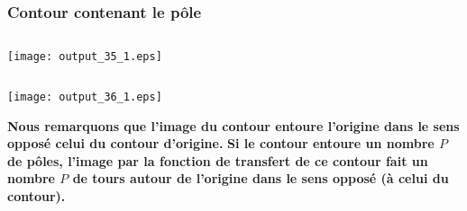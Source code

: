 \subsubsection{Contour contenant le pôle}
\begin{tcolorbox}[breakable, size=fbox, boxrule=1pt, pad at break*=1mm,colback=cellbackground, colframe=cellborder]
\inputminted{python}{codes/python/annexe_cauchy_cellule15.py}
\end{tcolorbox}
\begin{center}
    \texttt{[image: output\_35\_1.eps]}
\end{center}
\begin{tcolorbox}[breakable, size=fbox, boxrule=1pt, pad at break*=1mm,colback=cellbackground, colframe=cellborder]
\inputminted{python}{codes/python/annexe_cauchy_cellule16.py}
\end{tcolorbox}
\begin{center}
    \texttt{[image: output\_36\_1.eps]}
\end{center}
\textbf{Nous remarquons que l'image du contour entoure l'origine dans le
sens opposé celui du contour d'origine.} 
\textbf{Si le contour entoure un nombre \(P\) de pôles, l'image par la
fonction de transfert de ce contour fait un nombre \(P\) de tours autour
de l'origine dans le sens opposé (à celui du contour).} 

